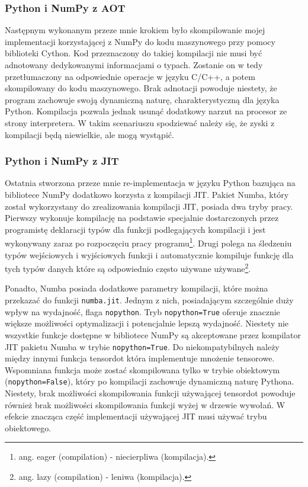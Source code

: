 \documentclass[11pt, a4paper]{article}
\newcommand{\code}[1]{\texttt{#1}}
\begin{document}
\begin{sloppypar}
    \subsubsection{Python i NumPy z AOT}
    Następnym wykonanym przeze mnie krokiem było skompilowanie mojej implementacji
    korzystającej z NumPy do kodu maszynowego przy pomocy biblioteki Cython. Kod przeznaczony
    do takiej kompilacji nie musi być adnotowany dedykowanymi informacjami o typach.
    Zostanie on w tedy przetłumaczony na odpowiednie operacje w języku C/C++, a potem skompilowany
    do kodu maszynowego. Brak adnotacji powoduje niestety, że program zachowuje swoją dynamiczną
    naturę, charakterystyczną dla języka Python. Kompilacja pozwala jednak usunąć dodatkowy
    narzut na procesor ze strony interpretera. W takim scenariuszu spodziewać należy się,
    że zyski z kompilacji będą niewielkie, ale mogą wystąpić.

    \subsubsection{Python i NumPy z JIT}
    Ostatnia stworzona przeze mnie re-implementacja w języku Python bazująca na
    bibliotece NumPy dodatkowo korzysta z kompilacji JIT. Pakiet Numba, który został
    wykorzystany do zrealizowania kompilacji JIT, posiada dwa tryby pracy. Pierwszy
    wykonuje kompilację na podstawie specjalnie dostarczonych przez programistę
    deklaracji typów dla funkcji podlegających kompilacji i jest wykonywany zaraz po
    rozpoczęciu pracy programu\footnote{ang. eager (compilation) - niecierpliwa (kompilacja).}.
    Drugi polega na śledzeniu typów wejściowych i wyjściowych funkcji i automatycznie kompiluje
    funkcję dla tych typów danych które są odpowiednio często używane używane\footnote{ang.
    lazy (compilation) - leniwa (kompilacja).}.

    Ponadto, Numba posiada dodatkowe parametry kompilacji, które można przekazać do funkcji
    \code{numba.jit}. Jednym z nich, posiadającym szczególnie duży wpływ na wydajność, flaga
    \code{nopython}. Tryb \code{nopython=True} oferuje znacznie większe możliwości
    optymalizacji i potencjalnie lepszą wydajność. Niestety nie wszystkie funkcje dostępne
    w bibliotece NumPy są akceptowane przez kompilator JIT pakietu Numba w trybie \code{nopython=True}.
    Do niekompatybilnych należy między innymi funkcja tensordot która implementuje mnożenie
    tensorowe. Wspomniana funkcja może zostać skompilowana tylko w trybie obiektowym (\code{nopython=False}),
    który po kompilacji zachowuje dynamiczną naturę Pythona. Niestety, brak możliwości
    skompilowania funkcji używającej tensordot powoduje również brak możliwości
    skompilowania funkcji wyżej w drzewie wywołań. W efekcie znacząca część implementacji
    używającej JIT musi używać trybu obiektowego.


\end{sloppypar}
\end{document}
